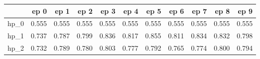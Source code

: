 \begin{tabular}{lrrrrrrrrrr}
\toprule
{} &   ep 0 &   ep 1 &   ep 2 &   ep 3 &   ep 4 &   ep 5 &   ep 6 &   ep 7 &   ep 8 &   ep 9 \\
\midrule
hp\_0 &  0.555 &  0.555 &  0.555 &  0.555 &  0.555 &  0.555 &  0.555 &  0.555 &  0.555 &  0.555 \\
hp\_1 &  0.737 &  0.787 &  0.799 &  0.836 &  0.817 &  0.855 &  0.811 &  0.834 &  0.832 &  0.798 \\
hp\_2 &  0.732 &  0.789 &  0.780 &  0.803 &  0.777 &  0.792 &  0.765 &  0.774 &  0.800 &  0.794 \\
\bottomrule
\end{tabular}
